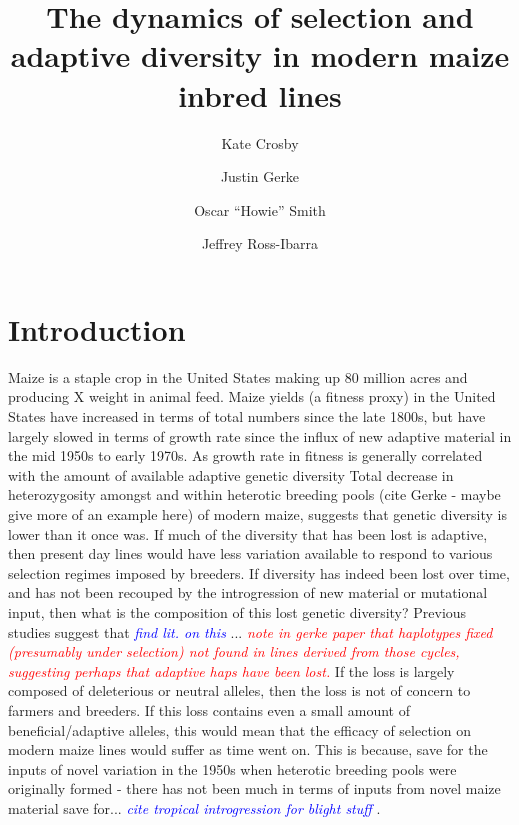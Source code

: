 \documentclass[9pt,twocolumn,twoside]{gsajnl}
\title{The dynamics of selection and adaptive diversity in modern maize inbred lines}
\author[$\ast$,1]{Kate Crosby}
\author[$\S$]{Justin Gerke}
\author[$\dagger$]{Oscar ``Howie'' Smith}
\author[$\ddagger$,1]{Jeffrey Ross-Ibarra}
\affil[$\ast$]{Author one affiliation}
\affil[$\S$]{Author two affiliation}
\affil[$\dagger$]{Author three affiliation}
\affil[$\ddagger$]{Author four affiliation}
\newcommand{\jri}[1]{\textcolor{red}{ \emph{ #1}} }
\newcommand{\kc}[1]{\textcolor{blue}{ \emph{ #1}} }
\begin{document}
\maketitle
\thispagestyle{firststyle}
\marginmark
\firstpagefootnote
{}
\vspace{-11pt}%




\section*{Introduction}

\lettrine[lines=2]{\color{color2}M}{}aize is a staple crop in the United States making up 80 million acres and producing X weight in animal feed. 
Maize yields (a fitness proxy) in the United States have increased in terms of total numbers since the late 1800s, but have largely slowed in terms of growth rate since the influx of new adaptive material in the mid 1950s to early 1970s. As growth rate in fitness is generally correlated with the amount of available adaptive genetic diversity 
Total decrease in heterozygosity amongst and within heterotic breeding pools (cite Gerke - maybe give more of an example here) of modern maize, suggests that genetic diversity is lower than it once was. 
If much of the diversity that has been lost is adaptive, then present day lines would have less variation available to respond to various selection regimes imposed by breeders. 
If diversity has indeed been lost over time, and has not been recouped by the introgression of new material or mutational input, then what is the composition of this lost genetic diversity? Previous studies suggest that \kc{find lit. on this}...
\jri{note in gerke paper that haplotypes fixed (presumably under selection) not found in lines derived from those cycles, suggesting perhaps that adaptive haps have been lost.}
If the loss is largely composed of deleterious or neutral alleles, then the loss is not of concern to farmers and breeders. 
If this loss contains even a small amount of beneficial/adaptive alleles, this would mean that the efficacy of selection on modern maize lines would suffer as time went on. 
This is because, save for the inputs of novel variation in the 1950s when heterotic breeding pools were originally formed - there has not been much in terms of inputs from novel maize material save for... \kc{cite tropical introgression for blight stuff}.
\end{document}
